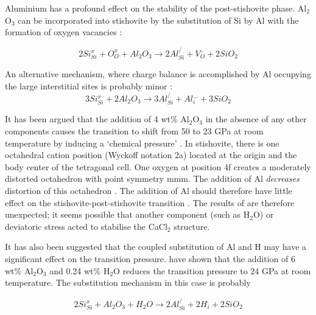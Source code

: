 \documentclass[review]{elsarticle}
\begin{document}
Aluminium has a profound effect on the stability of the post-stishovite phase. Al$_2$O$_3$ can be incorporated into stishovite by the substitution of Si by Al with the formation of oxygen vacancies \citep{SSP1995,HTSO2005,BBB2006,LLSHLOB2007}:

\begin{equation}
2Si^x_{Si} + O^x_O + Al_2O_3 \rightarrow 2Al^/_{Si} + V^{..}_O + 2SiO_2
\end{equation}

An alternative mechanism, where charge balance is accomplished by Al occupying the large interstitial sites is probably minor \cite{SSP1995}:
\begin{equation}
3Si^x_{Si} + 2Al_2O_3 \rightarrow 3Al^/_{Si} + Al^{...}_i + 3SiO_2
\end{equation}

It has been argued that the addition of 4 wt\% Al$_2$O$_3$ in the absence of any other components causes the transition to shift from 50 to 23 GPa at room temperature by inducing a `chemical pressure' \citep{BAAG2009}. In stishovite, there is one octahedral cation position (Wyckoff notation 2a) located at the origin and the body center of the tetragonal cell. One oxygen at position 4f creates a moderately distorted octahedron with point symmetry mmm. The addition of Al \emph{decreases} distortion of this octahedron \citep{SSP1995}. The addition of Al should therefore have little effect on the stishovite-post-stishovite transition \citep{Panero2006}. The results of \cite{BAAG2009} are therefore unexpected; it seems possible that another component (such as H$_2$O) or deviatoric stress acted to stabilise the CaCl$_2$ structure.

It has also been suggested that the coupled substitution of Al and H may have a significant effect on the transition pressure. \cite{Lakshtanovetal2007} have shown that the addition of 6 wt\% Al$_2$O$_3$ and 0.24 wt\% H$_2$O reduces the transition pressure to 24 GPa at room temperature. The substitution mechanism in this case is probably

\begin{equation}
2Si^x_{Si} + Al_2O_3 + H_2O \rightarrow 2Al^/_{Si} + 2H^{.}_i + 2SiO_2
\end{equation}
\end{document}
